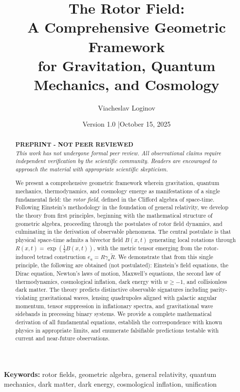 \documentclass[11pt,a4paper]{article}
\title{\textbf{The Rotor Field:\\
A Comprehensive Geometric Framework\\
for Gravitation, Quantum Mechanics, and Cosmology}}
\author[1]{Viacheslav Loginov}
\affil[1]{Kyiv, Ukraine\\ \texttt{barthez.slavik@gmail.com}}
\date{\small Version 1.0 \quad|\quad October 15, 2025}
\numberwithin{equation}{section}
\theoremstyle{plain}
\theoremstyle{definition}
\theoremstyle{remark}
\newcommand{\rev}[1]{\widetilde{#1}}       %
\begin{document}
\maketitle

\begin{abstract}
\noindent
\textbf{PREPRINT - NOT PEER REVIEWED}\\
\textit{This work has not undergone formal peer review. All observational claims require independent verification by the scientific community. Readers are encouraged to approach the material with appropriate scientific skepticism.}

\medskip
\noindent
We present a comprehensive geometric framework wherein gravitation, quantum mechanics, thermodynamics, and cosmology emerge as manifestations of a single fundamental field: the \emph{rotor field}, defined in the Clifford algebra of space-time. Following Einstein's methodology in the foundation of general relativity, we develop the theory from first principles, beginning with the mathematical structure of geometric algebra, proceeding through the postulates of rotor field dynamics, and culminating in the derivation of observable phenomena. The central postulate is that physical space-time admits a bivector field $B(x,t)$ generating local rotations through $R(x,t) = \exp(\frac{1}{2}B(x,t))$, with the metric tensor emerging from the rotor-induced tetrad construction $e_a = R\gamma_a\rev{R}$. We demonstrate that from this single principle, the following are obtained (not postulated): Einstein's field equations, the Dirac equation, Newton's laws of motion, Maxwell's equations, the second law of thermodynamics, cosmological inflation, dark energy with $w \geq -1$, and collisionless dark matter. The theory predicts distinctive observable signatures including parity-violating gravitational waves, lensing quadrupoles aligned with galactic angular momentum, tensor suppression in inflationary spectra, and gravitational wave sidebands in precessing binary systems. We provide a complete mathematical derivation of all fundamental equations, establish the correspondence with known physics in appropriate limits, and enumerate falsifiable predictions testable with current and near-future observations.
\end{abstract}

\noindent\textbf{Keywords:} rotor fields, geometric algebra, general relativity, quantum mechanics, dark matter, dark energy, cosmological inflation, unification

\tableofcontents
\newpage
\end{document}
